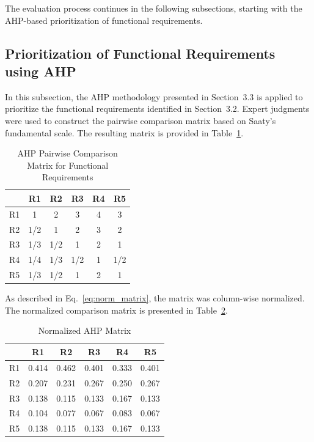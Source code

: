 \documentclass[twocolumn]{svjour3}
\begin{document}
The evaluation process continues in the following subsections, starting with the AHP-based prioritization of functional requirements.


\subsection{Prioritization of Functional Requirements using AHP}

In this subsection, the AHP methodology presented in Section~3.3 is applied to prioritize the functional requirements identified in Section~3.2. Expert judgments were used to construct the pairwise comparison matrix based on Saaty’s fundamental scale. The resulting matrix is provided in Table~\ref{tab:ahp_matrix}.

\begin{table}[H]
\centering
\caption{AHP Pairwise Comparison Matrix for Functional Requirements}
\label{tab:ahp_matrix}
\begin{tabular}{|c|c|c|c|c|c|}
\hline
 & R1 & R2 & R3 & R4 & R5 \\
\hline
R1 & 1   & 2   & 3   & 4   & 3   \\
R2 & 1/2 & 1   & 2   & 3   & 2   \\
R3 & 1/3 & 1/2 & 1   & 2   & 1   \\
R4 & 1/4 & 1/3 & 1/2 & 1   & 1/2 \\
R5 & 1/3 & 1/2 & 1   & 2   & 1   \\
\hline
\end{tabular}
\end{table}

As described in Eq.~\ref{eq:norm_matrix}, the matrix was column-wise normalized. The normalized comparison matrix is presented in Table~\ref{tab:ahp_normalized}.

\begin{table}[H]
\centering
\caption{Normalized AHP Matrix}
\label{tab:ahp_normalized}
\begin{tabular}{|c|c|c|c|c|c|}
\hline
 & R1 & R2 & R3 & R4 & R5 \\
\hline
R1 & 0.414 & 0.462 & 0.401 & 0.333 & 0.401 \\
R2 & 0.207 & 0.231 & 0.267 & 0.250 & 0.267 \\
R3 & 0.138 & 0.115 & 0.133 & 0.167 & 0.133 \\
R4 & 0.104 & 0.077 & 0.067 & 0.083 & 0.067 \\
R5 & 0.138 & 0.115 & 0.133 & 0.167 & 0.133 \\
\hline
\end{tabular}
\end{table}
\end{document}
